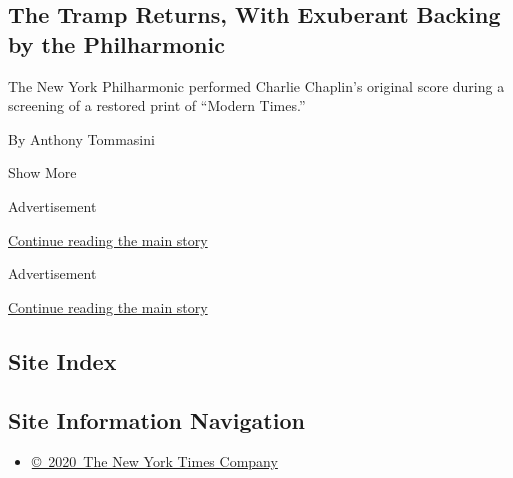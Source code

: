\begin{enumerate}
  \hypertarget{the-tramp-returns-with-exuberant-backing-by-the-philharmonic}{%
  \subsection{The Tramp Returns, With Exuberant Backing by the
  Philharmonic}\label{the-tramp-returns-with-exuberant-backing-by-the-philharmonic}}

  The New York Philharmonic performed Charlie Chaplin's original score
  during a screening of a restored print of ``Modern Times.''

  By Anthony Tommasini
\end{enumerate}

Show More

Advertisement

\protect\hyperlink{after-mid1}{Continue reading the main story}

Advertisement

\protect\hyperlink{after-mktg}{Continue reading the main story}

\hypertarget{site-index}{%
\subsection{Site Index}\label{site-index}}

\hypertarget{site-information-navigation}{%
\subsection{Site Information
Navigation}\label{site-information-navigation}}

\begin{itemize}
\tightlist
\item
  \href{https://help.nytimes.com/hc/en-us/articles/115014792127-Copyright-notice}{©~2020~The
  New York Times Company}
\end{itemize}

